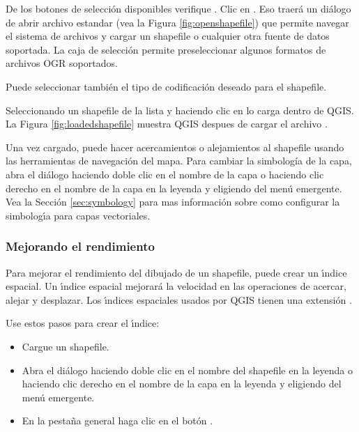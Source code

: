De los botones de selecci\'on disponibles verifique . Clic en . Eso traer\'a un di\'alogo de abrir archivo estandar (vea la Figura \ref{fig:openshapefile}) que permite navegar el sistema de archivos y cargar un  shapefile o cualquier otra fuente de datos soportada. 
La caja de selecci\'on  permite preseleccionar algunos formatos de archivos OGR soportados.

Puede seleccionar también el tipo de codificaci\'on deseado para el shapefile.

Seleccionando un shapefile de la lista y haciendo clic en  lo carga dentro de QGIS. La Figura
\ref{fig:loadedshapefile} muestra QGIS despues de cargar el archivo .


\begin{Tip}\caption{\textsc{Colores de la capa}}
\end{Tip}

Una vez cargado, puede hacer acercamientos o alejamientos al shapefile usando las herramientas de navegaci\'on del mapa.
Para cambiar la simbolog\'ia de la capa, abra el di\'alogo  haciendo doble clic en el nombre de la capa o haciendo clic derecho en el nombre de la capa en la leyenda y eligiendo  del men\'u emergente. Vea la  Secci\'on \ref{sec:symbology} para mas informaci\'on sobre como configurar la simbolog\'{\i}a para capas vectoriales.
  
\subsubsection{Mejorando el rendimiento}

Para mejorar el rendimiento del dibujado de un shapefile, puede crear un \'{\i}ndice espacial. Un \'{\i}ndice espacial  mejorar\'a la velocidad en las operaciones de acercar, alejar y desplazar. Los \'{\i}ndices espaciales usados por QGIS tienen una extensi\'on .

Use estos pasos para crear el \'{\i}ndice:

\begin{itemize}
\item Cargue un shapefile.
\item Abra el di\'alogo  haciendo doble clic en el nombre del shapefile en la leyenda o haciendo clic derecho en el nombre de la capa en la leyenda y eligiendo  del men\'u emergente.
\item En la pesta\~na general  haga clic en el bot\'on .
\end{itemize}

